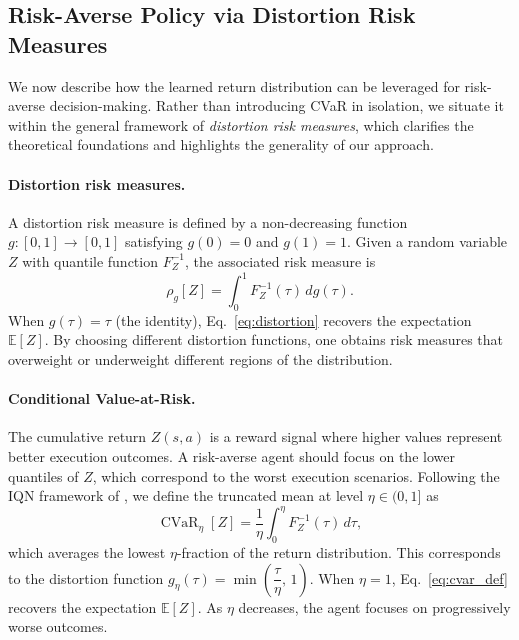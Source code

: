\documentclass[11pt]{article}
\begin{document}
\subsection*{Risk-Averse Policy via Distortion Risk Measures}\label{subsec:risk_policy}


We now describe how the learned return distribution can be leveraged for risk-averse decision-making. Rather than introducing CVaR in isolation, we situate it within the general framework of \emph{distortion risk measures}, which clarifies the theoretical foundations and highlights the generality of our approach.
\paragraph{Distortion risk measures.}
A distortion risk measure \citet{wang2000class} is defined by a non-decreasing function $g:[0,1] \to [0,1]$ satisfying $g(0) = 0$ and $g(1) = 1$. Given a random variable $Z$ with quantile function $F_Z^{-1}$, the associated risk measure is
\begin{equation}\label{eq:distortion}
    \rho_g[Z] = \int_0^1 F_Z^{-1}(\tau)\, dg(\tau).
\end{equation}
When $g(\tau) = \tau$ (the identity), Eq.~\eqref{eq:distortion} recovers the expectation $\mathbb{E}[Z]$. By choosing different distortion functions, one obtains risk measures that overweight or underweight different regions of the distribution.
\paragraph{Conditional Value-at-Risk.}
The cumulative return $Z(s,a)$ is a reward signal where higher 
values represent better execution outcomes. A risk-averse agent 
should focus on the lower quantiles of $Z$, which correspond to 
the worst execution scenarios. Following the IQN framework of 
\citet{dabney2018implicit}, we define the truncated mean at 
level $\eta \in (0,1]$ as
\begin{equation}\label{eq:cvar_def}
    \operatorname{CVaR}_\eta[Z] 
    = \frac{1}{\eta} \int_0^{\eta} 
    F_Z^{-1}(\tau)\, d\tau,
\end{equation}
which averages the lowest $\eta$-fraction of the return 
distribution. This corresponds to the distortion function 
$g_\eta(\tau) = \min\left(\dfrac{\tau}{\eta},\, 1\right)$. 
When $\eta = 1$, Eq.~\eqref{eq:cvar_def} recovers the 
expectation $\mathbb{E}[Z]$. As $\eta$ decreases, the agent 
focuses on progressively worse outcomes.
\end{document}
